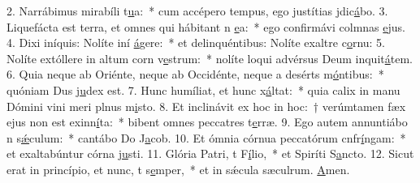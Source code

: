 2. Narrábimus mirabíli t\uline{u}a:~* cum accépero tempus, ego justítias jdic\uline{á}bo.
3. Liquefácta est terra, et omnes qui hábitant n \uline{e}a:~* ego confirmávi colmnas \uline{e}jus.
4. Dixi iníquis: Nolíte iní \uline{á}gere:~* et delinquéntibus: Nolíte exaltre c\uline{o}rnu:
5. Nolíte extóllere in altum corn v\uline{e}strum:~* nolíte loqui advérsus Deum inquit\uline{á}tem.
6. Quia neque ab Oriénte, neque ab Occidénte, neque a desérts m\uline{ó}ntibus:~* quóniam Dus j\uline{u}dex est.
7. Hunc humíliat, et hunc x\uline{á}ltat:~* quia calix in manu Dómini vini meri plnus m\uline{i}sto.
8. Et inclinávit ex hoc in hoc:~† verúmtamen fæx ejus non est exinn\uline{í}ta:~* bibent omnes peccatres t\uline{e}rræ.
9. Ego autem annuntiábo n s\uline{ǽ}culum:~* cantábo Do J\uline{a}cob.
10. Et ómnia córnua peccatórum cnfr\uline{í}ngam:~* et exaltabúntur córna j\uline{u}sti.
11. Glória Patri, t F\uline{í}lio,~* et Spiríti S\uline{a}ncto.
12. Sicut erat in princípio, et nunc, t s\uline{e}mper,~* et in sǽcula sæculrum. \uline{A}men.

